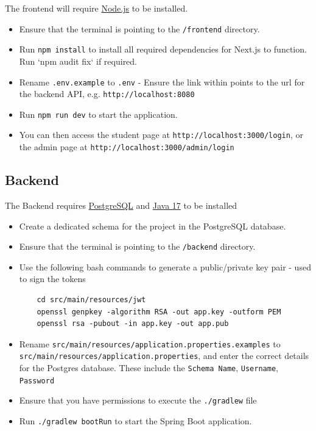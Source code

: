 \documentclass[]{final_report}
\begin{document}
The frontend will require \href{https://nodejs.org/en}{Node.js} to be installed.
\begin{itemize}
\item Ensure that the terminal is pointing to the \verb|/frontend| directory. 

\item Run \verb|npm install| to install all required dependencies for Next.js to function. Run `npm audit fix` if required.

\item Rename \verb|.env.example| to \verb|.env| - Ensure the link within points to the url for the backend API, e.g. \verb|http://localhost:8080|

\item Run \verb|npm run dev| to start the application.
\item You can then access the student page at \verb|http://localhost:3000/login|, or the admin page at \verb|http://localhost:3000/admin/login|
\end{itemize}

\subsection*{Backend}

The Backend requires \href{https://www.postgresql.org/download/}{PostgreSQL} and \href{https://www.oracle.com/java/technologies/javase/jdk17-archive-downloads.html}{Java 17} to be installed

\begin{itemize}
	\item Create a dedicated schema for the project in the PostgreSQL database.

	\item Ensure that the terminal is pointing to the \verb|/backend| directory.
	
	\item Use the following bash commands to generate a public/private key pair - used to sign the tokens
	\begin{lstlisting}
	cd src/main/resources/jwt
	openssl genpkey -algorithm RSA -out app.key -outform PEM
	openssl rsa -pubout -in app.key -out app.pub
	\end{lstlisting}

	\item Rename \verb|src/main/resources/application.properties.examples| to \verb|src/main/resources/application.properties|, and enter the correct details for the Postgres database. These include the \verb|Schema Name|, \verb|Username|, \verb|Password|
	
	\item Ensure that you have permissions to execute the \verb|./gradlew| file
	
	\item Run \verb|./gradlew bootRun| to start the Spring Boot application.
\end{itemize}
\end{document}

